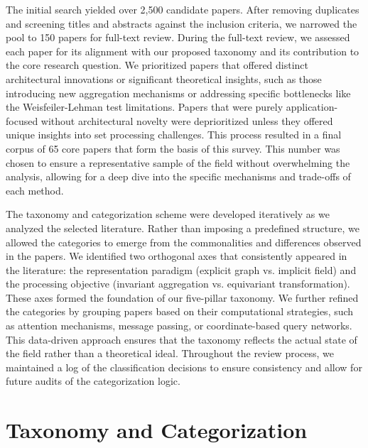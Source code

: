 \documentclass{article}
\begin{document}
The initial search yielded over 2,500 candidate papers. After removing duplicates and screening titles and abstracts against the inclusion criteria, we narrowed the pool to 150 papers for full-text review. During the full-text review, we assessed each paper for its alignment with our proposed taxonomy and its contribution to the core research question. We prioritized papers that offered distinct architectural innovations or significant theoretical insights, such as those introducing new aggregation mechanisms or addressing specific bottlenecks like the Weisfeiler-Lehman test limitations. Papers that were purely application-focused without architectural novelty were deprioritized unless they offered unique insights into set processing challenges. This process resulted in a final corpus of 65 core papers that form the basis of this survey. This number was chosen to ensure a representative sample of the field without overwhelming the analysis, allowing for a deep dive into the specific mechanisms and trade-offs of each method.

The taxonomy and categorization scheme were developed iteratively as we analyzed the selected literature. Rather than imposing a predefined structure, we allowed the categories to emerge from the commonalities and differences observed in the papers. We identified two orthogonal axes that consistently appeared in the literature: the representation paradigm (explicit graph vs. implicit field) and the processing objective (invariant aggregation vs. equivariant transformation). These axes formed the foundation of our five-pillar taxonomy. We further refined the categories by grouping papers based on their computational strategies, such as attention mechanisms, message passing, or coordinate-based query networks. This data-driven approach ensures that the taxonomy reflects the actual state of the field rather than a theoretical ideal. Throughout the review process, we maintained a log of the classification decisions to ensure consistency and allow for future audits of the categorization logic.

\section{Taxonomy and Categorization}

\label{sec:taxonomy_and_categorization}
\end{document}
